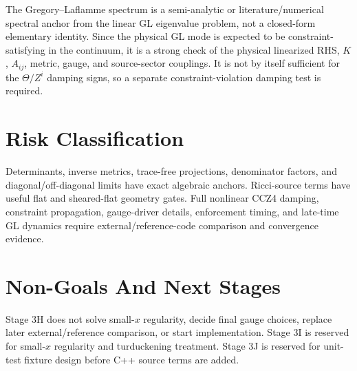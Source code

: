\documentclass[11pt]{article}
\begin{document}
The Gregory--Laflamme spectrum is a semi-analytic or literature/numerical
spectral anchor from the linear GL eigenvalue problem, not a closed-form
elementary identity. Since the physical GL mode is expected to be
constraint-satisfying in the continuum, it is a strong check of the physical
linearized RHS, \(K\), \(A_{ij}\), metric, gauge, and source-sector couplings.
It is not by itself sufficient for the \(\Theta/Z^i\) damping signs, so a
separate constraint-violation damping test is required.

\section{Risk Classification}

Determinants, inverse metrics, trace-free projections, denominator factors, and
diagonal/off-diagonal limits have exact algebraic anchors. Ricci-source terms
have useful flat and sheared-flat geometry gates. Full nonlinear CCZ4 damping,
constraint propagation, gauge-driver details, enforcement timing, and late-time
GL dynamics require external/reference-code comparison and convergence evidence.

\section{Non-Goals And Next Stages}

Stage 3H does not solve small-\(x\) regularity, decide final gauge choices,
replace later external/reference comparison, or start implementation. Stage 3I
is reserved for small-\(x\) regularity and turduckening treatment. Stage 3J is
reserved for unit-test fixture design before C++ source terms are added.
\end{document}
